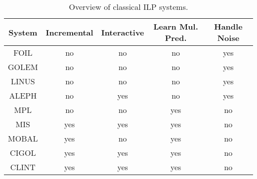 \begin{table}[t]
\centering
\begin{tabular}{|c|c|c|c|c|}
\hline
System & Incremental & Interactive & Learn Mul. Pred. & Handle Noise\\
\hline
FOIL \cite{foil} & no & no & no & yes \\
GOLEM \cite{golem} & no & no & no & yes \\
LINUS \cite{linus} & no & no & no & yes \\
ALEPH \cite{aleph} & no & yes & no & yes \\
MPL \cite{mpl} & no & no & yes & no \\
MIS \cite{mis} & yes & yes & yes & no \\
MOBAL \cite{mobal} & yes & no & yes & no \\
CIGOL \cite{cigol} & yes & yes & yes & no \\
CLINT \cite{clint} & yes & yes & yes & no \\
\hline
\end{tabular}
\caption{Overview of classical ILP systems.}
\label{tab:ilp}
\end{table}